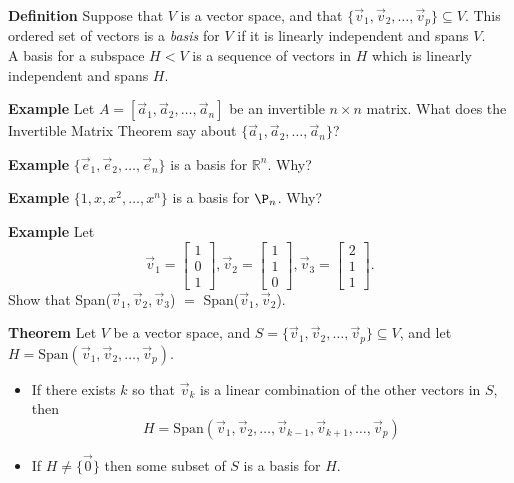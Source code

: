  \begin{frame}[fragile]
\textbf{Definition}
Suppose that $V$ is a vector space, and that 
$\{\vec{v}_1, \vec{v}_2, \dots , \vec{v}_p\} \subseteq  V$.  This ordered set of vectors
is a {\em basis} for $V$ if it is linearly independent and spans $V$.  \\ 
A basis for a subspace 
$H<V$ is a sequence of vectors in $H$ which is linearly independent and spans $H$. 




\textbf{Example}
Let $A = [\vec{a}_1,\vec{a}_2, \dots , \vec{a}_n  ] $
be an invertible $n \times n$ matrix.  What does the Invertible Matrix Theorem say about 
$\{ \vec{a}_1, \vec{a}_2,\dots,\vec{a}_n\}$?  



\textbf{Example}
$\{\vec{e}_1,\vec{e}_2, \dots ,\vec{e}_n \}$ is a basis 
for $\mathbb R^n$.  Why?

\end{frame}





 \begin{frame}[fragile]
\textbf{Example}
$\{1, x, x^2, \dots ,x^n  \}$ is a basis for $\P_n$.  Why?



\textbf{Example}
 Let 
\[
\vec{v}_1 = \left[\begin{array}{rrrrrrrr} 1 \\ 0 \\ 1 \end{array}\right], 
\vec{v}_2 = \left[\begin{array}{rrrrrrrr} 1 \\ 1 \\ 0 \end{array}\right],
\vec{v}_3 = \left[\begin{array}{rrrrrrrr} 2 \\ 1 \\ 1 \end{array}\right].
\]
Show that Span($\vec{v}_1,\vec{v}_2,\vec{v}_3$) $=$ 
Span($\vec{v}_1,\vec{v}_2$).

\end{frame}





 \begin{frame}[fragile]
\textbf{Theorem}
Let $V$ be a vector space, and $S = \{\vec{v}_1, \vec{v}_2, \dots
,\vec{v}_p  \} \subseteq V$, and let $H = \mbox{Span}(\vec{v}_1, \vec{v}_2,
\dots, \vec{v}_p)$. 
\begin{itemize}
\item If there exists $k$ so that $\vec{v}_k$ is a linear combination of the other
vectors in $S$, then 
\[
H = \mbox{Span}(\vec{v}_1, \vec{v}_2,
\dots, \vec{v}_{k-1}, \vec{v}_{k+1}, \dots, \vec{v}_p)
\]
\item If $H \neq \{\vec{0} \}$ then some subset of $S$ is a basis for $H$.
\end{itemize}

\end{frame}







